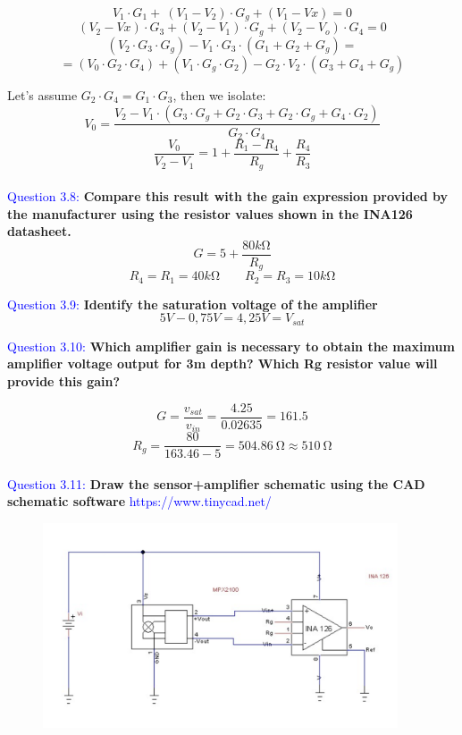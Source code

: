 \documentclass[12pt, a4papre]{article}
\begin{document}
	\[V_{1} \cdotp G_{1} +\ ( V_{1} -V_{2}) \cdotp G_{g} +( V_{1} -Vx) =0\]
	\[( V_{2} -Vx) \cdotp G_{3} +( V_{2} -V_{1}) \cdotp G_{g} +( V_{2} -V_{o}) \cdotp G_{4} =0\]
	\[( V_{2} \cdotp G_{3} \cdotp G_{g}) -V_{1} \cdotp G_{3} \cdotp ( G_{1} +G_{2} +G_{g}) =\]
	\[=( V_{0} \cdotp G_{2} \cdotp G_{4}) +( V_{1} \cdotp G_{g} \cdotp G_{2}) -G_{2} \cdotp V_{2} \cdotp ( G_{3} +G_{4} +G_{g})\]
	
	Let's assume $G_{2} \cdotp G_{4} =G_{1} \cdotp G_{3}$, then we isolate:
	\[V_{0}  = \frac{V_{2} -V_{1} \cdotp ( G_{3} \cdotp G_{g} +G_{2} \cdotp G_{3} +G_{2} \cdotp G_{g} +G_{4} \cdotp G_{2})}{G_{2} \cdotp G_{4}}\]
	\[\frac{V_{0}}{V_{2} -V_{1}} =1+\frac{R_{1} -R_{4}}{R_{g}} +\frac{R_{4}}{R_{3}}\]
	\\
	
	\textcolor{blue}{Question 3.8:} \textbf{Compare this result with the gain expression provided by the manufacturer using the resistor values shown in the INA126 datasheet.}\\
	\[
		G=5+\frac{80k\si{\ohm}}{R_{g}}
	\]
	\[
		R_{4} =R_{1} =40k\si{\ohm}\qquad
		R_{2} =R_{3} =10k\si{\ohm}
	\]

	\textcolor{blue}{Question 3.9:}\textbf{ Identify the saturation voltage of the amplifier}
	\[
		5 V - 0,75 V = 4,25 V = V_{sat}
	\]

	\textcolor{blue}{Question 3.10:} \textbf{Which amplifier gain is necessary to obtain the maximum amplifier voltage output for 3m depth? Which Rg resistor value will provide this gain?}
	
	\[
		G = \frac{v_{sat}}{v_{in}} = \frac{4.25}{0.02635} =161.5
	\]
	\[
		R_g = \frac{80}{163.46-5} = \SI{504.86}{\ohm} \approx \SI{510}{\ohm}
	\]
	\\
	\textcolor{blue}{Question 3.11:} \textbf{Draw the sensor+amplifier schematic using the CAD schematic software} \textcolor{blue}{https://www.tinycad.net/}
	
	\begin{figure}[H]
		\begin{center}
		\includegraphics[width=105mm]{CirquitWP3.png}
		\end{center}
	\end{figure}
	
\end{document}
